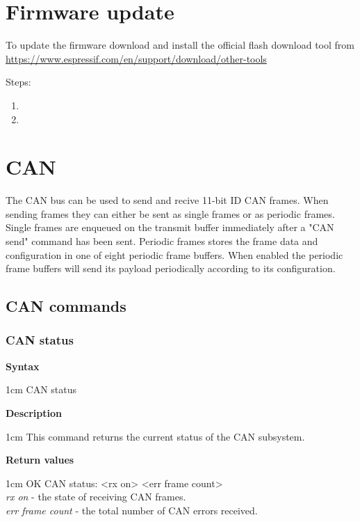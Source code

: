 \documentclass{article}[a4paper]
\begin{document}
\section{Firmware update}
To update the firmware download and install the official flash download tool from
\url{https://www.espressif.com/en/support/download/other-tools}

Steps:
\begin{enumerate}
\item
\item
\end{enumerate}

\section{CAN}
The CAN bus can be used to send and recive 11-bit ID CAN frames.
When sending frames they can either be sent as single frames or as periodic
frames. Single frames are enqueued on the transmit buffer immediately after a
"CAN send" command has been sent. Periodic frames stores the frame data and
configuration in one
of eight periodic frame buffers. When enabled the periodic frame buffers will
send its payload periodically according to its configuration.


\subsection{CAN commands}
\subsubsection{CAN status}
\begin{tcolorbox}
	{\bf Syntax}

	 1cm \dimexpr\linewidth-2cm\relax
	CAN status

	\medskip
	{\bf Description}

	 1cm \dimexpr\linewidth-2cm\relax
	This command returns the current status of the CAN subsystem.

	\medskip
	{\bf Return values}

	 1cm \dimexpr\linewidth-2cm\relax
	OK CAN status: <rx on> <err frame count>
	\medskip \\
	{\it rx on} - the state of receiving CAN frames. \\
	{\it err frame count} - the total number of CAN errors received.
\end{tcolorbox}
\end{document}
